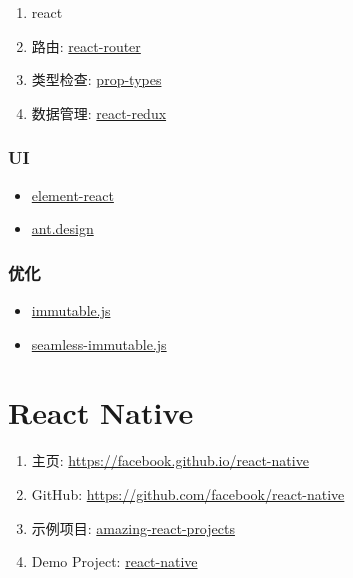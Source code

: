 \begin{enumerate}
\def\labelenumi{\arabic{enumi}.}
\tightlist
\item
  react
\item
  路由:
  \href{https://github.com/ReactTraining/react-router}{react-router}
\item
  类型检查: \href{https://github.com/facebook/prop-types}{prop-types}
\item
  数据管理: \href{https://github.com/reactjs/react-redux}{react-redux}
\end{enumerate}

\subsubsection{UI}\label{ui}

\begin{itemize}
\tightlist
\item
  \href{https://eleme.github.io/element-react/}{element-react}
\item
  \href{https://ant.design/}{ant.design}
\end{itemize}

\subsubsection{优化}\label{ux4f18ux5316}

\begin{itemize}
\tightlist
\item
  \href{https://github.com/facebook/immutable-js}{immutable.js}
\item
  \href{https://github.com/rtfeldman/seamless-immutable}{seamless-immutable.js}
\end{itemize}

\section{React Native}\label{react-native}

\begin{enumerate}
\def\labelenumi{\arabic{enumi}.}
\tightlist
\item
  主页: \url{https://facebook.github.io/react-native}
\item
  GitHub: \url{https://github.com/facebook/react-native}
\item
  示例项目:
  \href{https://github.com/jiwonbest/amazing-react-projects}{amazing-react-projects}
\item
  Demo Project:
  \href{https://github.com/HereChen/template/tree/master/react-native}{react-native}
\end{enumerate}

